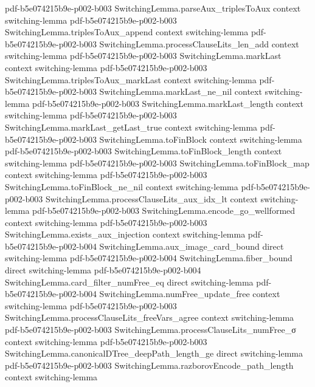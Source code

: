 \begin{lemma}
  {pdf-b5e074215b9e-p002-b003}
\proofstep
  {SwitchingLemma.parseAux_triplesToAux}
  {context}
  {switching-lemma}
  {pdf-b5e074215b9e-p002-b003}
\proofstep
  {SwitchingLemma.triplesToAux_append}
  {context}
  {switching-lemma}
  {pdf-b5e074215b9e-p002-b003}
\proofstep
  {SwitchingLemma.processClauseLits_len_add}
  {context}
  {switching-lemma}
  {pdf-b5e074215b9e-p002-b003}
\proofstep
  {SwitchingLemma.markLast}
  {context}
  {switching-lemma}
  {pdf-b5e074215b9e-p002-b003}
\proofstep
  {SwitchingLemma.triplesToAux_markLast}
  {context}
  {switching-lemma}
  {pdf-b5e074215b9e-p002-b003}
\proofstep
  {SwitchingLemma.markLast_ne_nil}
  {context}
  {switching-lemma}
  {pdf-b5e074215b9e-p002-b003}
\proofstep
  {SwitchingLemma.markLast_length}
  {context}
  {switching-lemma}
  {pdf-b5e074215b9e-p002-b003}
\proofstep
  {SwitchingLemma.markLast_getLast_true}
  {context}
  {switching-lemma}
  {pdf-b5e074215b9e-p002-b003}
\proofstep
  {SwitchingLemma.toFinBlock}
  {context}
  {switching-lemma}
  {pdf-b5e074215b9e-p002-b003}
\proofstep
  {SwitchingLemma.toFinBlock_length}
  {context}
  {switching-lemma}
  {pdf-b5e074215b9e-p002-b003}
\proofstep
  {SwitchingLemma.toFinBlock_map}
  {context}
  {switching-lemma}
  {pdf-b5e074215b9e-p002-b003}
\proofstep
  {SwitchingLemma.toFinBlock_ne_nil}
  {context}
  {switching-lemma}
  {pdf-b5e074215b9e-p002-b003}
\proofstep
  {SwitchingLemma.processClauseLits_aux_idx_lt}
  {context}
  {switching-lemma}
  {pdf-b5e074215b9e-p002-b003}
\proofstep
  {SwitchingLemma.encode_go_wellformed}
  {context}
  {switching-lemma}
  {pdf-b5e074215b9e-p002-b003}
\proofstep
  {SwitchingLemma.exists_aux_injection}
  {context}
  {switching-lemma}
  {pdf-b5e074215b9e-p002-b004}
\proofstep
  {SwitchingLemma.aux_image_card_bound}
  {direct}
  {switching-lemma}
  {pdf-b5e074215b9e-p002-b004}
\proofstep
  {SwitchingLemma.fiber_bound}
  {direct}
  {switching-lemma}
  {pdf-b5e074215b9e-p002-b004}
\proofstep
  {SwitchingLemma.card_filter_numFree_eq}
  {direct}
  {switching-lemma}
  {pdf-b5e074215b9e-p002-b004}
\proofstep
  {SwitchingLemma.numFree_update_free}
  {context}
  {switching-lemma}
  {pdf-b5e074215b9e-p002-b003}
\proofstep
  {SwitchingLemma.processClauseLits_freeVars_agree}
  {context}
  {switching-lemma}
  {pdf-b5e074215b9e-p002-b003}
\proofstep
  {SwitchingLemma.processClauseLits_numFree_σ}
  {context}
  {switching-lemma}
  {pdf-b5e074215b9e-p002-b003}
\proofstep
  {SwitchingLemma.canonicalDTree_deepPath_length_ge}
  {direct}
  {switching-lemma}
  {pdf-b5e074215b9e-p002-b003}
\proofstep
  {SwitchingLemma.razborovEncode_path_length}
  {context}
  {switching-lemma}

\end{lemma}
